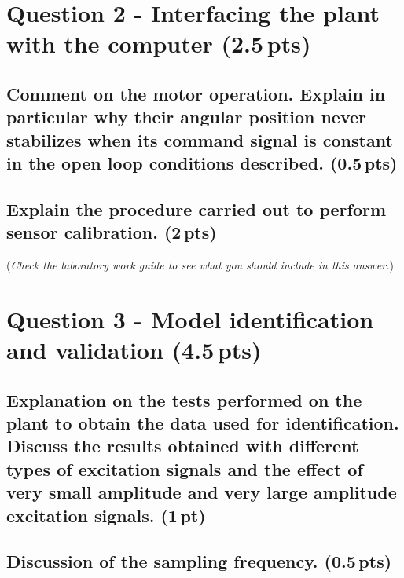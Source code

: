 \documentclass[a4paper,12pt]{article}
\begin{document}


\section{Question 2 - Interfacing the plant with the computer (2.5\,pts)}
\label{sec:q2}

\subsection{Comment on the motor operation. Explain in particular why their angular position never stabilizes when its command signal is constant in the open loop conditions described. (0.5\,pts)}
\vspace{10pt}


\subsection{Explain the procedure carried out to perform sensor calibration. (2\,pts)}
(\textit{Check the laboratory work guide to see what you should include in this answer.})
\vspace{15pt}



\section{Question 3 - Model identification and validation (4.5\,pts)}
\label{sec:q3}

\subsection{Explanation on the tests performed on the plant to obtain the data used for identification. Discuss the results obtained with different types of excitation signals and the effect of very small amplitude and very large amplitude excitation signals. (1\,pt)}
\vspace{10pt}


\subsection{Discussion of the sampling frequency. (0.5\,pts)}
\vspace{10pt}

\end{document}
